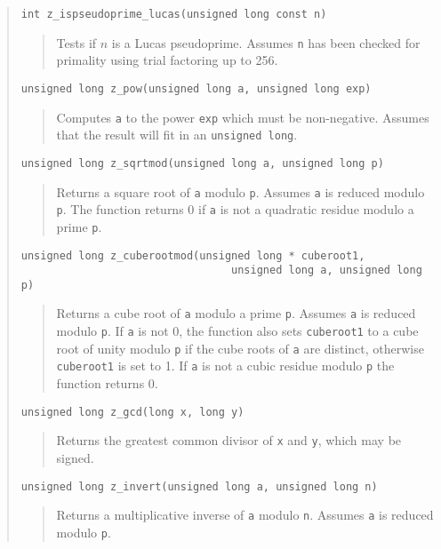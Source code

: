 \documentclass[a4paper,10pt]{article}
\newcommand{\code}{\lstinline}
\begin{document}
\begin{quote}
\begin{lstlisting}
int z_ispseudoprime_lucas(unsigned long const n)
\end{lstlisting}
\begin{quote}
Tests if $n$ is a Lucas pseudoprime.  Assumes \code{n} has been checked for primality using trial factoring up to 256. 
\end{quote}

\begin{lstlisting}
unsigned long z_pow(unsigned long a, unsigned long exp)
\end{lstlisting}
\begin{quote}
Computes \code{a} to the power \code{exp} which must be non-negative. Assumes that the result will fit in an \code{unsigned long}.
\end{quote}

\begin{lstlisting}
unsigned long z_sqrtmod(unsigned long a, unsigned long p)
\end{lstlisting}
\begin{quote}
Returns a square root of \code{a} modulo \code{p}. Assumes \code{a} is reduced modulo \code{p}. The function returns 0 if \code{a} is not a quadratic residue modulo a prime \code{p}.
\end{quote}

\begin{lstlisting}
unsigned long z_cuberootmod(unsigned long * cuberoot1, 
                                 unsigned long a, unsigned long p)
\end{lstlisting}
\begin{quote}
Returns a cube root of \code{a} modulo a prime \code{p}. Assumes \code{a} is reduced modulo \code{p}. If \code{a} is not 0, the function also sets \code{cuberoot1} to a cube root of unity modulo \code{p} if the cube roots of \code{a} are distinct, otherwise \code{cuberoot1} is set to 1. If \code{a} is not a cubic residue modulo \code{p} the function returns 0.
\end{quote}

\begin{lstlisting}
unsigned long z_gcd(long x, long y)
\end{lstlisting}
\begin{quote}
Returns the greatest common divisor of \code{x} and \code{y}, which may be signed.
\end{quote}

\begin{lstlisting}
unsigned long z_invert(unsigned long a, unsigned long n)
\end{lstlisting}
\begin{quote}
Returns a multiplicative inverse of \code{a} modulo \code{n}. Assumes \code{a} is reduced modulo \code{p}.
\end{quote}


\end{quote}
\end{document}
